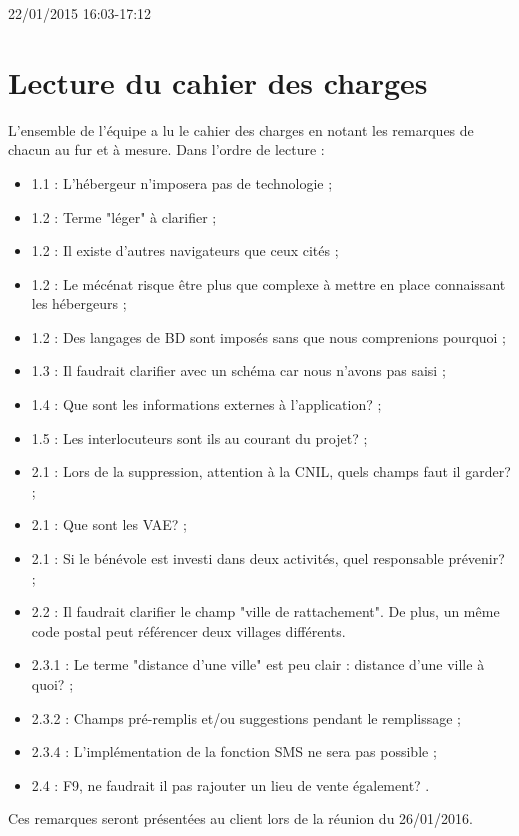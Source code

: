 \documentclass [a4paper] {article}
\begin{document}
22/01/2015			 				%
\hfill   
\hfill 	 16:03-17:12 				%






\section{Lecture du cahier des charges}
L'ensemble de l'équipe a lu le cahier des charges en notant les remarques de chacun au fur et à mesure. Dans l'ordre de lecture :
\begin{itemize}
\item 1.1 : L'hébergeur n'imposera pas de technologie ;
\item 1.2 : Terme "léger" à clarifier ;
\item 1.2 : Il existe d'autres navigateurs que ceux cités ;
\item 1.2 : Le mécénat risque être plus que complexe à mettre en place connaissant les hébergeurs ;
\item 1.2 : Des langages de BD sont imposés sans que nous comprenions pourquoi ;
\item 1.3 : Il faudrait clarifier avec un schéma car nous n'avons pas saisi ;
\item 1.4 : Que sont les informations externes à l'application? ;
\item 1.5 : Les interlocuteurs sont ils au courant du projet? ;
\item 2.1 : Lors de la suppression, attention à la CNIL, quels champs faut il garder? ;
\item 2.1 : Que sont les VAE? ;
\item 2.1 : Si le bénévole est investi dans deux activités, quel responsable prévenir? ;
\item 2.2 : Il faudrait clarifier le champ "ville de rattachement". De plus, un même code postal peut référencer deux villages différents.
\item 2.3.1 : Le terme "distance d'une ville" est peu clair : distance d'une ville à quoi? ;
\item 2.3.2 : Champs pré-remplis et/ou suggestions pendant le remplissage ;
\item 2.3.4 : L'implémentation de la fonction SMS ne sera pas possible ;
\item 2.4 : F9, ne faudrait il pas rajouter un lieu de vente également? .
\end{itemize}
Ces remarques seront présentées au client lors de la réunion du 26/01/2016.

\end{document}
